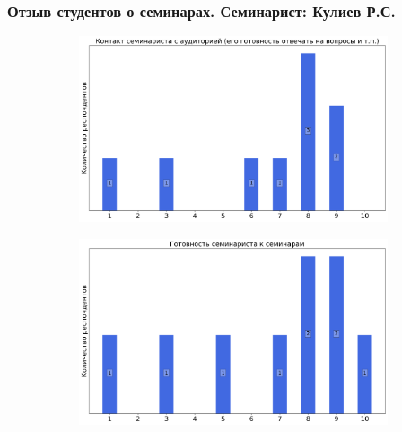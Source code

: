         
    \subsubsection{Отзыв студентов о семинарах. Семинарист: Кулиев Р.С.}
        \begin{figure}[H]
            \centering
            \begin{subfigure}[b]{0.45\textwidth}
                \centering
                \includegraphics[width=\textwidth]{images/1 course/Информатика/seminarists-marks-Кулиев Р.С.-0.png}
            \end{subfigure}
            \begin{subfigure}[b]{0.45\textwidth}
                \centering
                \includegraphics[width=\textwidth]{images/1 course/Информатика/seminarists-marks-Кулиев Р.С.-1.png}
            \end{subfigure}
            \begin{subfigure}[b]{0.45\textwidth}
                \centering

\end{subfigure}
\end{figure}
